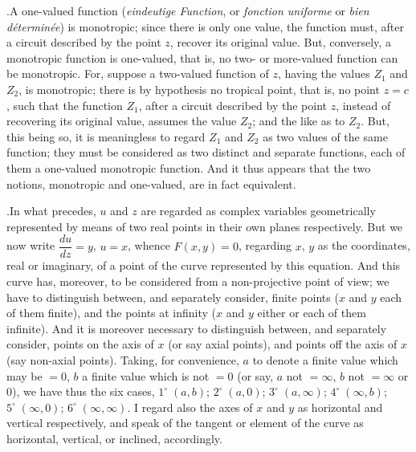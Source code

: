 \documentclass[11pt]{article}
\begin{document}
\medskip

.\quad A one-valued function (\textit{eindeutige Function}, or \textit{fonction uniforme} or \textit{bien d\'etermin\'ee}) is monotropic; since there is only one value, the function must, after a circuit described by the point $z$, recover its original value. But, conversely, a monotropic function is one-valued, that is, no two- or more-valued function can be monotropic. For, suppose a two-valued function of $z$, having the values $Z_{1}$ and $Z_{2}$, is monotropic; there is by hypothesis no tropical point, that is, no point $z=c$, such that the function $Z_{1}$, after a circuit described by the point $z$, instead of recovering its original value, assumes the value $Z_{2}$; and the like as to $Z_{2}$. But, this being so, it is meaningless to regard $Z_{1}$ and $Z_{2}$ as two values of the same function; they must be considered as two distinct and separate functions, each of them a one-valued monotropic function. And it thus appears that the two notions, monotropic and one-valued, are in fact equivalent.

\medskip

.\quad In what precedes, $u$ and $z$ are regarded as complex variables geometrically represented by means of two real points in their own planes respectively. But we now write $\dfrac{du}{dz} = y$, $u=x$, whence $F(x,y)=0$, regarding $x$, $y$ as the coordinates, real or imaginary, of a point of the curve represented by this equation. And this curve has, moreover, to be considered from a non-projective point of view; we have to distinguish between, and separately consider, finite points ($x$ and $y$ each of them finite), and the points at infinity ($x$ and $y$ either or each of them infinite). And it is moreover necessary to distinguish between, and separately consider, points on the axis of $x$ (or say axial points), and points off the axis of $x$ (say non-axial points). Taking, for convenience, $a$ to denote a finite value which may be $=0$, $b$ a finite value which is not $=0$ (or say, $a$ not $=\infty$, $b$ not $=\infty$ or $0$), we have thus the six cases, $1^{\circ}\;(a,b)$; $2^{\circ}\;(a,0)$; $3^{\circ}\;(a,\infty)$; $4^{\circ}\;(\infty,b)$; $5^{\circ}\;(\infty,0)$; $6^{\circ}\;(\infty,\infty)$. I regard also the axes of $x$ and $y$ as horizontal and vertical respectively, and speak of the tangent or element of the curve as horizontal, vertical, or inclined, accordingly.

\medskip
\end{document}
